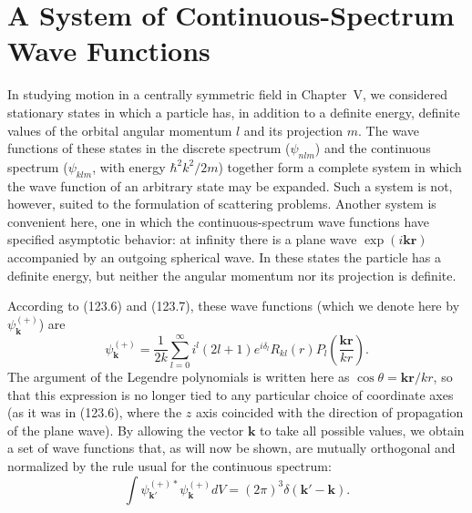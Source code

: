 \section{A System of Continuous-Spectrum Wave Functions}

In studying motion in a centrally symmetric field in Chapter~V, we considered stationary states in which a particle has, in addition to a definite energy, definite values of the orbital angular momentum $l$ and its projection $m$. The wave functions of these states in the discrete spectrum ($\psi_{nlm}$) and the continuous spectrum ($\psi_{klm}$, with energy $\hbar^2k^2/2m$) together form a complete system in which the wave function of an arbitrary state may be expanded. Such a system is not, however, suited to the formulation of scattering problems. Another system is convenient here, one in which the continuous-spectrum wave functions have specified asymptotic behavior: at infinity there is a plane wave $\exp(i\mathbf{kr})$ accompanied by an outgoing spherical wave. In these states the particle has a definite energy, but neither the angular momentum nor its projection is definite.

According to (123.6) and (123.7), these wave functions (which we denote here by $\psi_{\mathbf k}^{(+)}$) are
\begin{equation}
 \psi_{\mathbf k}^{(+)}=\frac1{2k}\sum_{l=0}^{\infty}i^l(2l+1)e^{i\delta_l}R_{kl}(r)
 P_l\left(\frac{\mathbf{kr}}{kr}\right).
 \tag{136.1}
\end{equation}
The argument of the Legendre polynomials is written here as $\cos\theta=\mathbf{kr}/kr$, so that this expression is no longer tied to any particular choice of coordinate axes (as it was in (123.6), where the $z$ axis coincided with the direction of propagation of the plane wave). By allowing the vector $\mathbf k$ to take all possible values, we obtain a set of wave functions that, as will now be shown, are mutually orthogonal and normalized by the rule usual for the continuous spectrum:
\begin{equation}
 \int\psi_{\mathbf k'}^{(+)*}\psi_{\mathbf k}^{(+)}dV=(2\pi)^3\delta(\mathbf k'-\mathbf k).
 \tag{136.2}
\end{equation}

